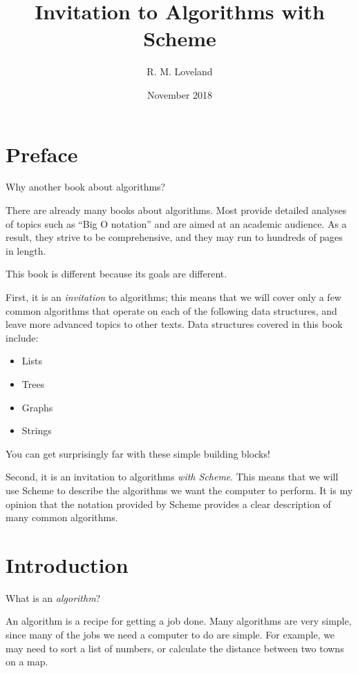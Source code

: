 \documentclass[12pt,openright,draft]{book}
\begin{document}
\title{Invitation to Algorithms with Scheme}
\author{R. M. Loveland}
\date{November 2018}

\frontmatter{}
\maketitle{}

\tableofcontents{}

\chapter{Preface}

Why another book about algorithms?

There are already many books about algorithms.  Most provide detailed
analyses of topics such as ``Big O notation'' and are aimed at an
academic audience.  As a result, they strive to be comprehensive, and
they may run to hundreds of pages in length.

This book is different because its goals are different.

First, it is an \emph{invitation} to algorithms; this means that we
will cover only a few common algorithms that operate on each of the
following data structures, and leave more advanced topics to other
texts.  Data structures covered in this book include:

\begin{itemize}
\item Lists
\item Trees
\item Graphs
\item Strings
\end{itemize}

You can get surprisingly far with these simple building blocks!

Second, it is an invitation to algorithms \emph{with Scheme}.  This
means that we will use Scheme to describe the algorithms we want the
computer to perform.  It is my opinion that the notation provided by
Scheme provides a clear description of many common algorithms.

\chapter{Introduction}

What is an \emph{algorithm}?

An algorithm is a recipe for getting a job done.  Many algorithms are
very simple, since many of the jobs we need a computer to do are
simple.  For example, we may need to sort a list of numbers, or
calculate the distance between two towns on a map.
\end{document}
